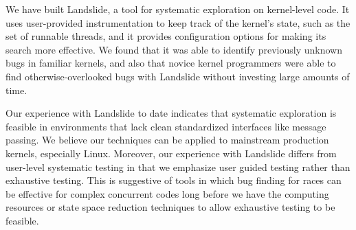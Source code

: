 \documentclass{llncs}
\begin{document}
We have built Landslide, a tool for systematic exploration on kernel-level code.
It uses user-provided instrumentation to keep track of the kernel's state, such as the set of runnable threads, and it provides configuration options for making its search more effective.
We found that it was able to identify previously unknown bugs in familiar kernels, and also that novice kernel programmers were able to find otherwise-overlooked bugs with Landslide without investing large amounts of time.

Our experience with Landslide to date indicates that systematic exploration is feasible in environments that lack clean standardized interfaces like message passing.
We believe our techniques can be applied to mainstream production kernels, especially Linux.
Moreover, our experience with Landslide differs from user-level systematic testing in that we emphasize user guided testing rather than exhaustive testing. This is suggestive of tools in which bug finding for races can be effective for complex concurrent codes long before we have the computing resources or state space reduction techniques to allow exhaustive testing to be feasible.



{}

\end{document}
